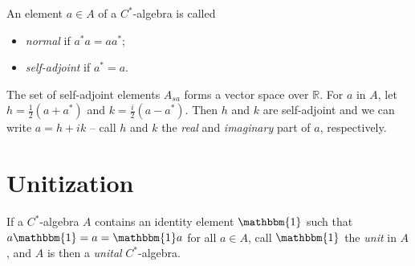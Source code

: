 \documentclass[12pt,a4paper]{report}
\theoremstyle{plain}
\theoremstyle{definition}
\newcommand{\1}{\mathbbm{1}}
\newcommand{\R}{\mathbb{R}}
\begin{document}
An element $a\in A$ of a $C^\ast$-algebra is called
\begin{itemize}
	\item	\emph{normal} if $a^\ast a=aa^\ast$;
	\item 	\emph{self-adjoint} if $a^\ast=a$.
\end{itemize}
The set of self-adjoint elements $A_{sa}$ forms a vector space over $\R$.
For $a$ in $A$, let $h=\tfrac{1}{2}(a+a^\ast)$ and $k=\tfrac{i}{2}(a-a^\ast)$. Then $h$ and $k$ are 
self-adjoint and we can write $a=h+ik$ -- call $h$ and $k$ the \emph{real} and \emph{imaginary} part of
$a$, respectively.



\section{Unitization}
If a $C^\ast$-algebra $A$ contains an identity element $\1$ such that 
$a \1 = a = \1  a$ for all $a \in A$, call $\1$ the \emph{unit} 
in $A$, and $A$ is then a \emph{unital} $C^\ast$-algebra.
\end{document}
